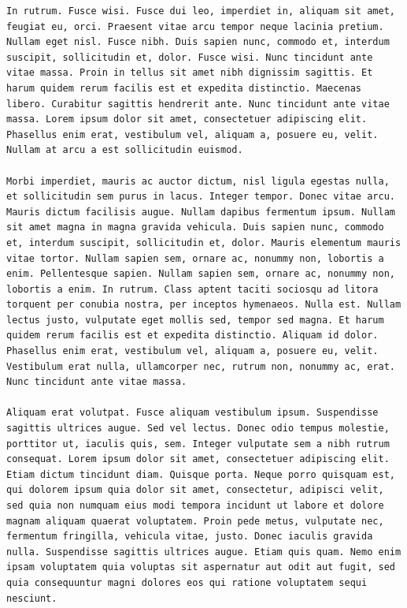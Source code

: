 \documentclass[a4paper, 12pt]{article}
\begin{document}
\begin{verbatim}
In rutrum. Fusce wisi. Fusce dui leo, imperdiet in, aliquam sit amet, feugiat eu, orci. Praesent vitae arcu tempor neque lacinia pretium. Nullam eget nisl. Fusce nibh. Duis sapien nunc, commodo et, interdum suscipit, sollicitudin et, dolor. Fusce wisi. Nunc tincidunt ante vitae massa. Proin in tellus sit amet nibh dignissim sagittis. Et harum quidem rerum facilis est et expedita distinctio. Maecenas libero. Curabitur sagittis hendrerit ante. Nunc tincidunt ante vitae massa. Lorem ipsum dolor sit amet, consectetuer adipiscing elit. Phasellus enim erat, vestibulum vel, aliquam a, posuere eu, velit. Nullam at arcu a est sollicitudin euismod.

Morbi imperdiet, mauris ac auctor dictum, nisl ligula egestas nulla, et sollicitudin sem purus in lacus. Integer tempor. Donec vitae arcu. Mauris dictum facilisis augue. Nullam dapibus fermentum ipsum. Nullam sit amet magna in magna gravida vehicula. Duis sapien nunc, commodo et, interdum suscipit, sollicitudin et, dolor. Mauris elementum mauris vitae tortor. Nullam sapien sem, ornare ac, nonummy non, lobortis a enim. Pellentesque sapien. Nullam sapien sem, ornare ac, nonummy non, lobortis a enim. In rutrum. Class aptent taciti sociosqu ad litora torquent per conubia nostra, per inceptos hymenaeos. Nulla est. Nullam lectus justo, vulputate eget mollis sed, tempor sed magna. Et harum quidem rerum facilis est et expedita distinctio. Aliquam id dolor. Phasellus enim erat, vestibulum vel, aliquam a, posuere eu, velit. Vestibulum erat nulla, ullamcorper nec, rutrum non, nonummy ac, erat. Nunc tincidunt ante vitae massa.

Aliquam erat volutpat. Fusce aliquam vestibulum ipsum. Suspendisse sagittis ultrices augue. Sed vel lectus. Donec odio tempus molestie, porttitor ut, iaculis quis, sem. Integer vulputate sem a nibh rutrum consequat. Lorem ipsum dolor sit amet, consectetuer adipiscing elit. Etiam dictum tincidunt diam. Quisque porta. Neque porro quisquam est, qui dolorem ipsum quia dolor sit amet, consectetur, adipisci velit, sed quia non numquam eius modi tempora incidunt ut labore et dolore magnam aliquam quaerat voluptatem. Proin pede metus, vulputate nec, fermentum fringilla, vehicula vitae, justo. Donec iaculis gravida nulla. Suspendisse sagittis ultrices augue. Etiam quis quam. Nemo enim ipsam voluptatem quia voluptas sit aspernatur aut odit aut fugit, sed quia consequuntur magni dolores eos qui ratione voluptatem sequi nesciunt.


\end{verbatim}
\end{document}

